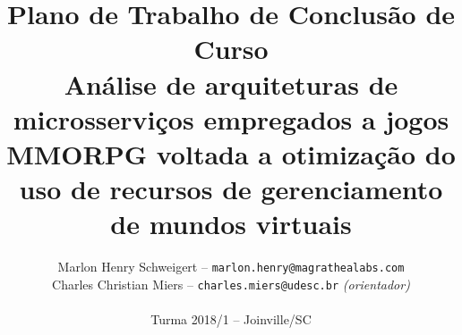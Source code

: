 \documentclass[11pt]{article}
\begin{document}
\pagestyle{fancy}

\title{
Plano de Trabalho de Conclusão de Curso\\
Análise de arquiteturas de microsserviços empregados a jogos MMORPG voltada a otimização do uso de recursos de gerenciamento de mundos virtuais
}

\author{
Marlon Henry Schweigert -- \texttt{marlon.henry@magrathealabs.com}\\
Charles Christian Miers -- \texttt{charles.miers@udesc.br} {\it (orientador)}\\
~\\
Turma 2018/1 -- Joinville/SC
}
\end{document}
